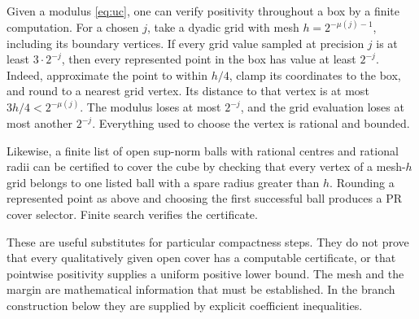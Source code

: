Given a modulus \eqref{eq:uc}, one can verify positivity throughout a box
by a finite computation.  For a chosen \(j\), take a dyadic grid with
mesh \(h=2^{-\mu(j)-1}\), including its boundary vertices.  If every
grid value sampled at precision \(j\) is at least \(3\cdot2^{-j}\),
then every represented point in the box has value at least \(2^{-j}\).
Indeed, approximate the point to within \(h/4\), clamp its coordinates
to the box, and round to a nearest grid vertex.  Its distance to that
vertex is at most \(3h/4<2^{-\mu(j)}\).  The modulus loses at most
\(2^{-j}\), and the grid evaluation loses at most another \(2^{-j}\).
Everything used to choose the vertex is rational and bounded.

Likewise, a finite list of open sup-norm balls with rational centres and
rational radii can be certified to cover
the cube by checking that every vertex of a mesh-\(h\) grid belongs to
one listed ball with a spare radius greater than \(h\).  Rounding a
represented point as above and choosing the first successful ball
produces a PR cover selector.  Finite search verifies the certificate.

These are useful substitutes for particular compactness steps.  They do
not prove that every qualitatively given open cover has a computable
certificate, or that pointwise positivity supplies a uniform positive
lower bound.  The mesh and the margin are mathematical information that
must be established.  In the branch construction below they are supplied
by explicit coefficient inequalities.
